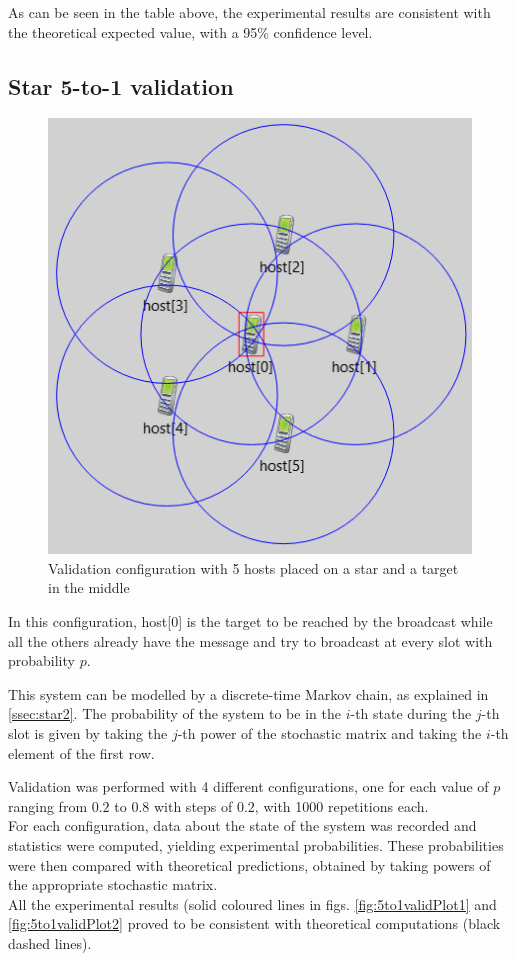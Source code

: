 As can be seen in the table above, %
the experimental results are consistent with the theoretical expected value, with a 95\% confidence level. %
\subsection{Star 5-to-1 validation}


\begin{figure}
\includegraphics[width=1\linewidth]{img/omnetStar5to1.png} 
\caption{Validation configuration with 5 hosts placed on a star and a target in the middle}
\label{fig:star5to1GUI}
\end{figure}

In this configuration, host[0] is the target to be reached by the broadcast while all the others already have the message and try to broadcast at every slot with probability $p$.

This system can be modelled by a discrete-time Markov chain, as explained in \ref{ssec:star2}.
The probability of the system to be in the $i$-th state during the $j$-th slot is given by taking the $j$-th power of the stochastic matrix and taking the $i$-th element of the first row.

Validation was performed with 4 different configurations, one for each value of $p$ ranging from $0.2$ to $0.8$ with steps of $0.2$, with 1000 repetitions each.\\
For each configuration, data about the state of the system was recorded and statistics were computed, yielding experimental probabilities. These probabilities were then compared with theoretical predictions, obtained by taking powers of the appropriate stochastic matrix.\\
All the experimental results (solid coloured lines in figs. \ref{fig:5to1validPlot1} and \ref{fig:5to1validPlot2} proved to be consistent with theoretical computations (black dashed lines).

